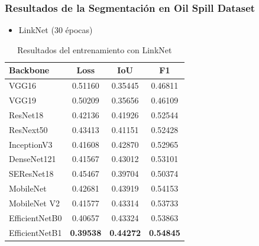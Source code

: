 \begin{frame}
\frametitle{Resultados de la Segmentación en Oil Spill Dataset}

\begin{itemize}
    \item LinkNet (30 épocas)
\end{itemize}
    \begin{table}[]
        \centering
        \small
        \begin{tabular}{l|c|c|c}
            \hline
            Backbone        & Loss    & IoU     & F1 \\
            \hline
            VGG16           & 0.51160 & 0.35445 & 0.46811 \\
            VGG19           & 0.50209 & 0.35656 & 0.46109 \\
            ResNet18        & 0.42136 & 0.41926 & 0.52544 \\
            ResNext50       & 0.43413 & 0.41151 & 0.52428 \\ 
            InceptionV3     & 0.41608 & 0.42870 & 0.52965 \\
            DenseNet121     & 0.41567 & 0.43012 & 0.53101 \\
            SEResNet18      & 0.45467 & 0.39704 & 0.50374 \\
            MobileNet       & 0.42681 & 0.43919 & 0.54153 \\ 
            MobileNet V2    & 0.41577 & 0.43314 & 0.53733 \\
            EfficientNetB0  & 0.40657 & 0.43324 & 0.53863 \\
            EfficientNetB1  & \textbf{0.39538} & \textbf{0.44272} & \textbf{0.54845} \\
            \hline
        \end{tabular}
        \caption{Resultados del entrenamiento con LinkNet}
        \label{tab:my_label}
    \end{table}

\end{frame}


